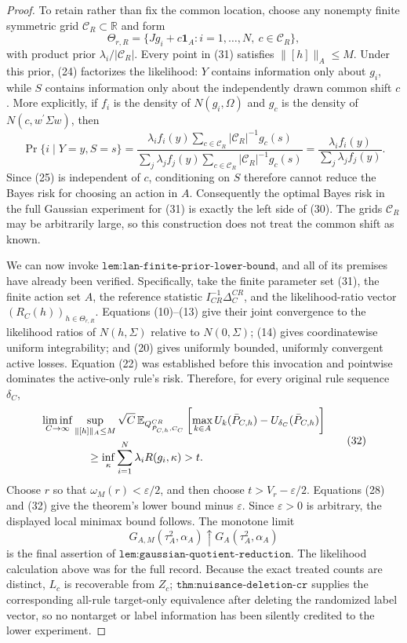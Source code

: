 \documentclass{article}
\begin{document}
\begin{proof}
To retain rather than fix the common location, choose any nonempty finite symmetric grid \(\mathcal C_R\subset\mathbb R\) and form
\[
 \Theta_{r,R}=\{Jg_i+c\mathbf1_A:
                  i=1,\ldots,N,\ c\in\mathcal C_R\},           \tag{31}
\]
with product prior \(\lambda_i/|\mathcal C_R|\).  Every point in (31) satisfies \(\lVert[h]\rVert_A\leq M\).  Under this prior, (24) factorizes the likelihood: \(Y\) contains information only about \(g_i\), while \(S\) contains information only about the independently drawn common shift \(c\).  More explicitly, if \(f_i\) is the density of \(N(g_i,\Omega)\) and \(g_c\) is the density of \(N(c,w^{\prime}\Sigma w)\), then
\[
 \Pr\{i\mid Y=y,S=s\}
 =\frac{\lambda_i f_i(y)\sum_{c\in\mathcal C_R}|\mathcal C_R|^{-1}g_c(s)}
        {\sum_j\lambda_j f_j(y)\sum_{c\in\mathcal C_R}|\mathcal C_R|^{-1}g_c(s)}
 =\frac{\lambda_i f_i(y)}{\sum_j\lambda_j f_j(y)}.
\]
Since (25) is independent of \(c\), conditioning on \(S\) therefore cannot reduce the Bayes risk for choosing an action in \(A\).  Consequently the optimal Bayes risk in the full Gaussian experiment for (31) is exactly the left side of (30).  The grids \(\mathcal C_R\) may be arbitrarily large, so this construction does not treat the common shift as known.

We can now invoke \(\texttt{lem:lan-finite-prior-lower-bound}\), and all of its premises have already been verified.  Specifically, take the finite parameter set (31), the finite action set \(A\), the reference statistic \(I_{CR}^{-1}\Delta_C^{CR}\), and the likelihood-ratio vector \((R_C(h))_{h\in\Theta_{r,R}}\).  Equations (10)--(13) give their joint convergence to the likelihood ratios of \(N(h,\Sigma)\) relative to \(N(0,\Sigma)\); (14) gives coordinatewise uniform integrability; and (20) gives uniformly bounded, uniformly convergent active losses.  Equation (22) was established before this invocation and pointwise dominates the active-only rule's risk.  Therefore, for every original rule sequence \(\delta_C\),
\[
 \begin{aligned}
 &\liminf_{C\to\infty}\sup_{\lVert[h]\rVert_A\leq M}
 \sqrt C\,\mathbb E_{Q^{CR}_{\bar P_{C,h},C_C}}
 \left[\max_{k\in A}U_k(\bar P_{C,h})
       -U_{\delta_C}(\bar P_{C,h})\right]\\
 &\hspace{15mm}\geq
 \inf_\kappa\sum_{i=1}^N\lambda_iR(g_i,\kappa)>t.
 \end{aligned}                                                   \tag{32}
\]
Choose \(r\) so that \(\omega_M(r)<\varepsilon/2\), and then choose
\(t>V_r-\varepsilon/2\).  Equations (28) and (32) give the theorem's lower bound minus \(\varepsilon\).  Since \(\varepsilon>0\) is arbitrary, the displayed local minimax bound follows.  The monotone limit
\[
 G_{A,M}(\tau_A^2,\alpha_A)\uparrow
 G_A(\tau_A^2,\alpha_A)
\]
is the final assertion of \(\texttt{lem:gaussian-quotient-reduction}\).  The likelihood calculation above was for the full record.  Because the exact treated counts are distinct, \(L_c\) is recoverable from \(Z_c\); \(\texttt{thm:nuisance-deletion-cr}\) supplies the corresponding all-rule target-only equivalence after deleting the randomized label vector, so no nontarget or label information has been silently credited to the lower experiment.


\end{proof}
\end{document}
